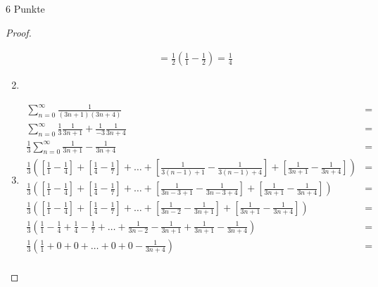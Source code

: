 \documentclass{problemset}
\begin{document}
\begin{problem}{6 Punkte}
\begin{proof}
\begin{enumerate}
\begin{align}
                                                                 & = \frac{1}{2}\left(\frac{1}{1} - \frac{1}{2}\right) = \frac{1}{4}
              \end{align}
        \item
        \item \begin{align*}
                  \sum_{n=0}^{\infty} \frac{1}{(3n + 1)(3n + 4)}                                                                                                                                                                                 & = \\
                  \sum_{n=0}^{\infty} \frac{1}{3}\frac{1}{3n + 1} + \frac{1}{-3}\frac{1}{3n + 4}                                                                                                                                                 & = \\
                  \frac{1}{3} \sum_{n=0}^{\infty} \frac{1}{3n + 1} - \frac{1}{3n + 4}                                                                                                                                                            & = \\
                  \frac{1}{3} \left(\left[\frac{1}{1} - \frac{1}{4}\right] + \left[\frac{1}{4} - \frac{1}{7}\right] + \ldots + \left[\frac{1}{3(n-1) + 1} - \frac{1}{3(n-1) +4}\right] + \left[\frac{1}{3n + 1} - \frac{1}{3n +4}\right] \right) & = \\
                  \frac{1}{3} \left(\left[\frac{1}{1} - \frac{1}{4}\right] + \left[\frac{1}{4} - \frac{1}{7}\right] + \ldots + \left[\frac{1}{3n -3 + 1} - \frac{1}{3n -3 + 4}\right] + \left[\frac{1}{3n + 1} - \frac{1}{3n +4}\right] \right)  & = \\
                  \frac{1}{3} \left(\left[\frac{1}{1} - \frac{1}{4}\right] + \left[\frac{1}{4} - \frac{1}{7}\right] + \ldots + \left[\frac{1}{3n - 2} - \frac{1}{3n + 1}\right] + \left[\frac{1}{3n + 1} - \frac{1}{3n +4}\right] \right)        & = \\
                  \frac{1}{3} \left(\frac{1}{1} - \frac{1}{4} + \frac{1}{4} - \frac{1}{7} + \ldots + \frac{1}{3n - 2} - \frac{1}{3n + 1} + \frac{1}{3n + 1} - \frac{1}{3n +4} \right)                                                            & = \\
                  \frac{1}{3} \left(\frac{1}{1} + 0 + 0 + \ldots + 0 + 0 - \frac{1}{3n +4} \right)                                                                                                                                               & = \\

\end{align*}
\end{enumerate}
\end{proof}
\end{problem}
\end{document}
